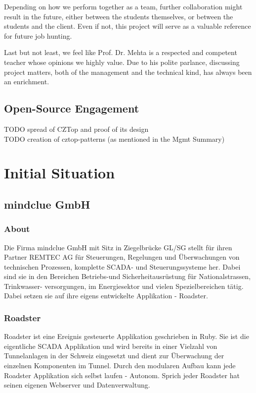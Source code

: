 Depending on how we perform together as a team, further collaboration might
result in the future, either between the students themselves, or between the
students and the client. Even if not, this project will serve as a valuable
reference for future job hunting.

Last but not least, we feel like Prof. Dr. Mehta is a respected and competent
teacher whose opinions we highly value. Due to his polite parlance, discussing
project matters, both of the management and the technical kind, has always been
an enrichment.

\subsection{Open-Source Engagement}
TODO spread of CZTop and proof of its design\\
TODO creation of cztop-patterns (as mentioned in the Mgmt Summary)\\

\section{Initial Situation}

\subsection{mindclue GmbH}
\subsubsection{About}
Die Firma mindclue GmbH mit Sitz in Ziegelbrücke GL/SG stellt für ihren
Partner REMTEC AG für Steuerungen, Regelungen und Überwachungen von technischen Prozessen,
komplette SCADA- und Steuerungssysteme her. Dabei sind sie in den Bereichen
Betriebs-und Sicherheitausrüstung für Nationalstrassen, Trinkwasser-
versorgungen, im Energiesektor und vielen Spezielbereichen tätig.
Dabei setzen sie auf ihre eigens entwickelte Applikation - Roadster.

\subsubsection{Roadster}
Roadster ist eine Ereignis gesteuerte Applikation geschrieben in Ruby.
Sie ist die eigentliche \gls{SCADA} Applikation und wird bereits in einer Vielzahl von
Tunnelanlagen in der Schweiz eingesetzt und dient zur Überwachung der einzelnen Komponenten im Tunnel.
Durch den modularen Aufbau kann jede Roadster Applikation sich selbst laufen - Autonom.
Sprich jeder Roadster hat seinen eigenen Webserver und Datenverwaltung.

